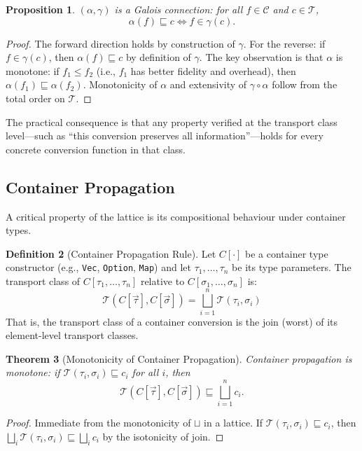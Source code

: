 \documentclass[11pt,a4paper]{article}
\newtheorem{theorem}{Theorem}[section]
\newtheorem{proposition}[theorem]{Proposition}
\theoremstyle{definition}
\newtheorem{definition}[theorem]{Definition}
\theoremstyle{remark}
\newcommand{\TC}{\mathcal{T}}                    %
\begin{document}
\begin{proposition}\label{prop:galois}
$(\alpha, \gamma)$ is a Galois connection: for all $f \in \mathcal{C}$
and $c \in \TC$,
\[
  \alpha(f) \sqsubseteq c \iff f \in \gamma(c).
\]
\end{proposition}
\begin{proof}
The forward direction holds by construction of $\gamma$.
For the reverse: if $f \in \gamma(c)$, then $\alpha(f)
\sqsubseteq c$ by definition of $\gamma$. The key observation is
that $\alpha$ is monotone: if $f_1 \leq f_2$ (i.e., $f_1$ has
better fidelity and overhead), then $\alpha(f_1) \sqsubseteq
\alpha(f_2)$. Monotonicity of $\alpha$ and extensivity of
$\gamma \circ \alpha$ follow from the total order on $\TC$.
\end{proof}

The practical consequence is that any property verified at the
transport class level---such as ``this conversion preserves all
information''---holds for every concrete conversion function in that
class.

\subsection{Container Propagation}\label{sec:propagation}

A critical property of the lattice is its compositional behaviour
under container types.

\begin{definition}[Container Propagation Rule]\label{def:container-prop}
Let $C[\cdot]$ be a container type constructor (e.g., \texttt{Vec},
\texttt{Option}, \texttt{Map}) and let
$\tau_1, \ldots, \tau_n$ be its type parameters. The transport class
of $C[\tau_1, \ldots, \tau_n]$ relative to
$C[\sigma_1, \ldots, \sigma_n]$ is:
\[
  \TC(C[\vec\tau], C[\vec\sigma]) =
    \bigsqcup_{i=1}^{n} \TC(\tau_i, \sigma_i)
\]
That is, the transport class of a container conversion is the join
(worst) of its element-level transport classes.
\end{definition}

\begin{theorem}[Monotonicity of Container Propagation]\label{thm:mono}
Container propagation is monotone: if $\TC(\tau_i, \sigma_i)
\sqsubseteq c_i$ for all $i$, then
\[
  \TC(C[\vec\tau], C[\vec\sigma]) \sqsubseteq
    \bigsqcup_{i=1}^{n} c_i.
\]
\end{theorem}
\begin{proof}
Immediate from the monotonicity of $\sqcup$ in a lattice.
If $\TC(\tau_i, \sigma_i) \sqsubseteq c_i$, then
$\bigsqcup_i \TC(\tau_i, \sigma_i) \sqsubseteq
\bigsqcup_i c_i$ by the isotonicity of join.
\end{proof}
\end{document}
